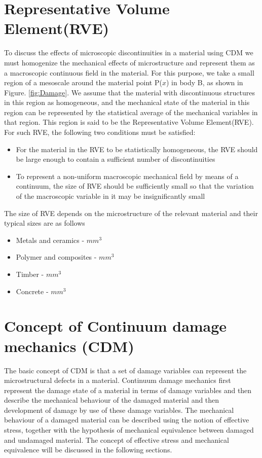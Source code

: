 \documentclass[a4paper,12pt,twoside]{report}
\begin{document}
\section{Representative Volume Element(RVE)}
\indent\indent\indent  To discuss the effects of microscopic discontinuities in a material using CDM we must homogenize the mechanical effects of microstructure and represent them as a macroscopic continuous field in the material. For this purpose, we take a small region of a mesoscale around the material point P($x$) in body B, as shown in Figure. \ref{fig:Damage}. We assume that the material with discontinuous structures in this region as homogeneous, and the mechanical state of the material in this region can be represented by the statistical average of the mechanical variables in that region. This region is said to be the Representative Volume Element(RVE). For such RVE, the following two conditions must be satisfied:
\begin{itemize}
\item  For the material in the RVE to be statistically homogeneous, the RVE should be large enough to contain a sufficient number of discontinuities
\item To represent a non-uniform macroscopic mechanical field by means of a continuum, the size of RVE should be sufficiently small so that the variation of the macroscopic variable in it may be insignificantly small
\end{itemize}
The size of RVE depends on the microstructure of the relevant material and their typical sizes are as follows
\begin{itemize}
\item Metals and ceramics  \;    -    $mm^3$
\item Polymer and composites \;   -   $mm^3$
\item Timber\; - $mm^3$
\item Concrete \; - $mm^3$
\end{itemize}

\section{Concept of Continuum damage mechanics (CDM)}
\indent\indent\indent The basic concept of CDM is that a set of damage variables can represent the microstructural defects in a material. Continuum damage mechanics first represent the damage state of a material in terms of damage variables and then describe the mechanical behaviour of the damaged material and then development of damage by use of these damage variables. The mechanical behaviour of a damaged material can be described using the notion of effective stress, together with the hypothesis of mechanical equivalence between damaged and undamaged material. The concept of effective stress and mechanical equivalence will be discussed in the following sections.
\end{document}
